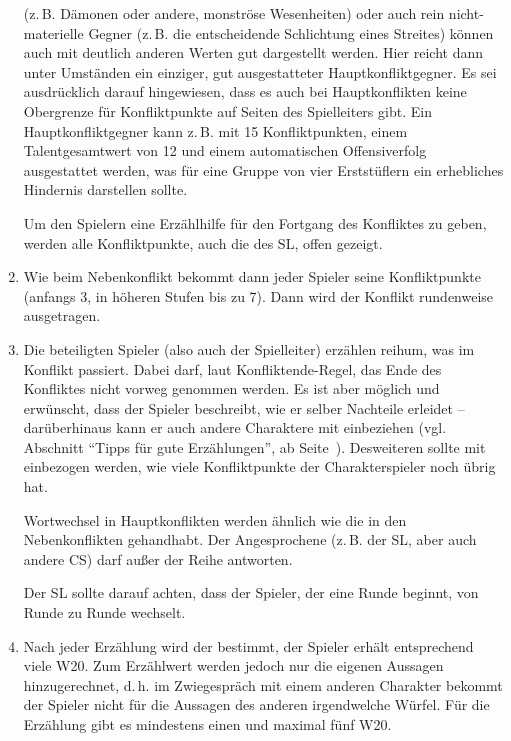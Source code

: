 \begin{enumerate}
\begin{design}
 (z.\,B. Dämonen oder andere, monströse Wesenheiten) oder auch rein nicht-materielle Gegner (z.\,B. die entscheidende Schlichtung eines Streites) können auch mit deutlich anderen Werten gut dargestellt werden. Hier reicht dann unter Umständen ein einziger, gut ausgestatteter Hauptkonfliktgegner. Es sei ausdrücklich darauf hingewiesen, dass es auch bei Hauptkonflikten keine Obergrenze für Konfliktpunkte auf Seiten des Spielleiters gibt. Ein Hauptkonfliktgegner kann z.\,B. mit 15 Konfliktpunkten, einem Talentgesamtwert von 12 und einem automatischen Offensiverfolg ausgestattet werden, was für eine Gruppe von vier Erststüflern ein erhebliches Hindernis darstellen sollte.
\end{design}


  Um den Spielern eine Erzählhilfe für den Fortgang des Konfliktes zu geben, werden alle Konfliktpunkte, auch die des SL, offen gezeigt.

  \item {Wie beim Nebenkonflikt bekommt dann jeder Spieler seine Konfliktpunkte (anfangs 3, in höheren Stufen bis zu 7).} Dann wird der Konflikt rundenweise ausgetragen.

  \item\label{HKNaechsteRunde} Die beteiligten Spieler (also auch der Spielleiter) erzählen reihum, was im Konflikt passiert. Dabei darf, laut Konfliktende-Regel, das Ende des Konfliktes nicht vorweg genommen werden. Es ist aber möglich und erwünscht, dass der Spieler beschreibt, wie er selber Nachteile erleidet -- darüberhinaus kann er auch andere Charaktere mit einbeziehen {(vgl. Abschnitt ``Tipps für gute Erzählungen'', ab Seite~\pageref{TippsGuteErz})}. Desweiteren sollte mit einbezogen werden, wie viele Konfliktpunkte der Charakterspieler noch übrig hat.

  Wortwechsel in Hauptkonflikten werden ähnlich wie die in den Nebenkonflikten gehandhabt. Der Angesprochene (z.\,B. der SL, aber auch andere CS) darf außer der Reihe antworten. 
  
  Der SL sollte darauf achten, dass der Spieler, der eine Runde beginnt, von Runde zu Runde wechselt.
  
  \item Nach jeder Erzählung wird der  bestimmt, der Spieler erhält entsprechend viele W20. Zum Erzählwert werden jedoch nur die eigenen Aussagen hinzugerechnet, d.\,h. im Zwiegespräch mit einem anderen Charakter bekommt der Spieler nicht für die Aussagen des anderen irgendwelche Würfel. Für die Erzählung gibt es mindestens einen und maximal fünf W20.


\end{enumerate}
